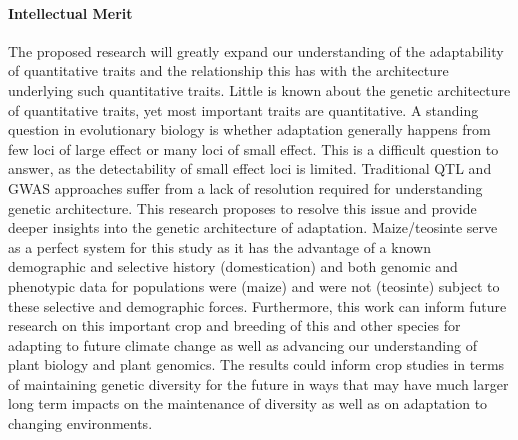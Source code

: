 \vspace{-0.4cm}

\paragraph{Intellectual Merit}  



The proposed research will greatly expand our understanding of the adaptability of quantitative traits and the relationship this has with the architecture underlying such quantitative traits. Little is known about the genetic architecture of quantitative traits, yet most important traits are quantitative. A standing question in evolutionary biology is whether adaptation generally happens from few loci of large effect or many loci of small effect. This is a difficult question to answer, as the detectability of small effect loci is limited. Traditional QTL and GWAS approaches suffer from a lack of resolution required for understanding genetic architecture. This research proposes to resolve this issue and provide deeper insights into the genetic architecture of adaptation. Maize\//teosinte  serve as a perfect system for this study as it has the advantage of a known demographic and selective history (domestication) and both genomic and phenotypic data for populations were (maize) and were not (teosinte) subject to these selective and demographic forces. Furthermore, this work can inform future research on this important crop and breeding of this and other species for adapting to future climate change as well as advancing our understanding of plant biology and plant genomics. The results could inform crop studies in terms of maintaining genetic diversity for the future in ways that may have much larger long term impacts on the maintenance of diversity as well as on adaptation to changing environments.

